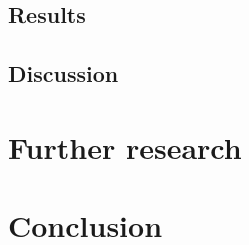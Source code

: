 \documentclass{article}
\begin{document}
\subsection{Results}\label{sec:results}


\subsection{Discussion}\label{sec:discussion}


\section{Further research}\label{sec:furtherResearch}


\section{Conclusion}\label{sec:conclusion}


\printbibliography%
\end{document}
